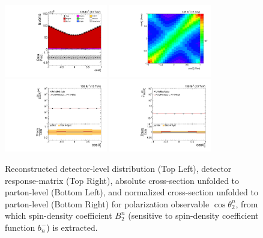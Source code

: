 \clearpage
\begin{figure}[htb]
\begin{center}
 \includegraphics[width=0.40\textwidth]{fig_fullRun2UL/controlplots/combined/Hyp_LeptonBn.pdf}
 \includegraphics[width=0.40\textwidth]{fig_fullRun2UL/unfolding/combined/ResponseMatrix_b2n.pdf} \\
 \includegraphics[width=0.40\textwidth]{fig_fullRun2UL/unfolding/combined/UnfoldedResults_b2n.pdf}
 \includegraphics[width=0.40\textwidth]{fig_fullRun2UL/unfolding/combined/UnfoldedResultsNorm_b2n.pdf} \\
\label{fig:b2n}
\caption{Reconstructed detector-level distribution (Top Left), detector response-matrix (Top Right), absolute cross-section unfolded to parton-level (Bottom Left), and normalized cross-section unfolded to parton-level (Bottom Right) for polarization observable $\cos\theta_{2}^{n}$, from which spin-density coefficient $B_{2}^{n}$ (sensitive to spin-density coefficient function $b_n^{-}$) is extracted.}
\end{center}
\end{figure}
